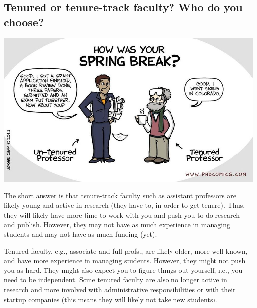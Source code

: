 \documentclass[oneside,11pt,dvipsnames]{book}
\newenvironment{commentbox}[1][]{
  \small
  \begin{mybox}
    {\small \textbf{#1}}
  }{
  \end{mybox}
}
\begin{document}
\subsection{Tenured or tenure-track faculty? Who do you choose?}\label{sec:tenure-vs-tenure-track}

\begin{center}
  \includegraphics[scale=0.4]{files/c8.png}
\end{center}


The short answer is that tenure-track faculty such as assistant professors are likely young and active in research (they have to, in order to get tenure). Thus, they will likely have more time to work with you and push you to do research and publish. However, they may not have as much experience in managing students and may not have as much funding (yet).

Tenured faculty, e.g., associate and full profs., are likely older, more well-known, and have more experience in managing students.  However, they might not push you as hard. They might also expect you to figure things out yourself, i.e., you need to be independent.  Some tenured faculty are also no longer active in research and more involved with administrative responsibilities or with their startup companies (this means they will likely not take new students).

\end{document}
